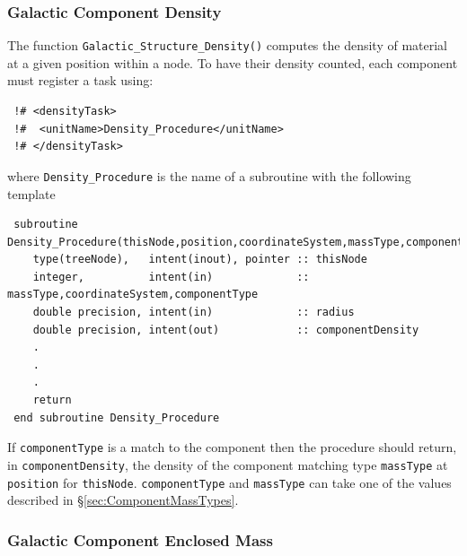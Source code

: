 \subsubsection{Galactic Component Density}

The function {\tt Galactic\_Structure\_Density()} computes the density of material at a given position within a node. To have their density counted, each component must register a task using:
\begin{verbatim}
 !# <densityTask>
 !#  <unitName>Density_Procedure</unitName>
 !# </densityTask>
\end{verbatim}
where {\tt Density\_Procedure} is the name of a subroutine with the following template
\begin{verbatim}
 subroutine Density_Procedure(thisNode,position,coordinateSystem,massType,componentType,componentDensity)
    type(treeNode),   intent(inout), pointer :: thisNode
    integer,          intent(in)             :: massType,coordinateSystem,componentType
    double precision, intent(in)             :: radius
    double precision, intent(out)            :: componentDensity
    .
    .
    .
    return
 end subroutine Density_Procedure
\end{verbatim}
If {\tt componentType} is a match to the component then the procedure should return, in {\tt componentDensity}, the density of the component matching type {\tt massType} at {\tt position} for {\tt thisNode}. {\tt componentType} and {\tt massType} can take one of the values described in \S\ref{sec:ComponentMassTypes}.

\subsubsection{Galactic Component Enclosed Mass}

